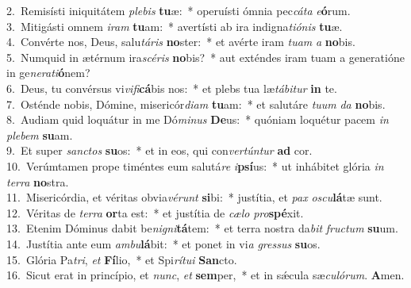 {2.~}Remisísti iniquitátem \textit{ple}\textit{bis} \textbf{tu}æ:~* operuísti ómnia pec\textit{cá}\textit{ta} \textit{e}\textbf{ó}rum.\\
{3.~}Mitigásti omnem \textit{i}\textit{ram} \textbf{tu}am:~* avertísti ab ira indigna\textit{ti}\textit{ó}\textit{nis} \textbf{tu}æ.\\
{4.~}Convérte nos, Deus, salu\textit{tá}\textit{ris} \textbf{no}ster:~* et avérte iram \textit{tu}\textit{am} \textit{a} \textbf{no}bis.\\
{5.~}Numquid in ætérnum ira\textit{scé}\textit{ris} \textbf{no}bis?~* aut exténdes iram tuam a generatióne in ge\textit{ne}\textit{ra}\textit{ti}\textbf{ó}nem?\\
{6.~}Deus, tu convérsus vi\textit{vi}\textit{fi}\textbf{cá}bis nos:~* et plebs tua læ\textit{tá}\textit{bi}\textit{tur} \textbf{in} te.\\
{7.~}Osténde nobis, Dómine, misericór\textit{di}\textit{am} \textbf{tu}am:~* et salutáre \textit{tu}\textit{um} \textit{da} \textbf{no}bis.\\
{8.~}Audiam quid loquátur in me Dó\textit{mi}\textit{nus} \textbf{De}us:~* quóniam loquétur pacem \textit{in} \textit{ple}\textit{bem} \textbf{su}am.\\
{9.~}Et super \textit{san}\textit{ctos} \textbf{su}os:~* et in eos, qui con\textit{ver}\textit{tún}\textit{tur} \textbf{ad} cor.\\
{10.~}Verúmtamen prope timéntes eum salutá\textit{re} \textit{i}\textbf{psí}us:~* ut inhábitet glória \textit{in} \textit{ter}\textit{ra} \textbf{no}stra.\\
{11.~}Misericórdia, et véritas obvia\textit{vé}\textit{runt} \textbf{si}bi:~* justítia, et \textit{pax} \textit{o}\textit{scu}\textbf{lá}tæ sunt.\\
{12.~}Véritas de \textit{ter}\textit{ra} \textbf{or}ta est:~* et justítia de \textit{cæ}\textit{lo} \textit{pro}\textbf{spé}xit.\\
{13.~}Etenim Dóminus dabit be\textit{ni}\textit{gni}\textbf{tá}tem:~* et terra nostra da\textit{bit} \textit{fru}\textit{ctum} \textbf{su}um.\\
{14.~}Justítia ante eum \textit{am}\textit{bu}\textbf{lá}bit:~* et ponet in vi\textit{a} \textit{gres}\textit{sus} \textbf{su}os.\\
{15.~}Glória Pa\textit{tri}, \textit{et} \textbf{Fí}lio,~* et Spi\textit{rí}\textit{tu}\textit{i} \textbf{San}cto.\\
{16.~}Sicut erat in princípio, et \textit{nunc}, \textit{et} \textbf{sem}per,~* et in sǽcula sæ\textit{cu}\textit{ló}\textit{rum}. \textbf{A}men.\\
